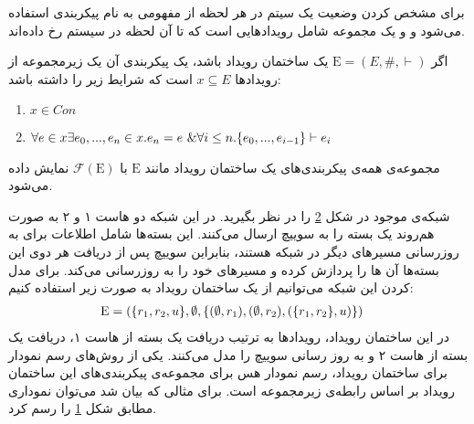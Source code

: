 برای مشخص کردن وضعیت یک سیتم در هر لحظه از مفهومی به نام پیکر‌بندی
استفاده می‌شود و
و یک مجموعه شامل رویدادهایی است که تا آن لحظه در سیستم رخ داده‌اند.
\begin{definition}
    اگر
    $\mathrm{E} = (E,\#,\vdash)$
    یک ساختمان رویداد باشد، یک پیکربندی آن یک زیرمجموعه از رویداد‌ها
    $x \subseteq E$
    است که شرایط زیر را داشته باشد:
    \begin{enumerate}
        \item $x \in Con$
        \item $\forall e \in x \exists e_0,...,e_n \in x. e_n = e \ \&
                  \forall i \leq n. \{e_0,...,e_{i-1}\} \vdash e_i$
    \end{enumerate}
\end{definition}
مجموعه‌ی همه‌ی پیکربندی‌های یک ساختمان رویداد مانند
$\mathrm{E}$
با
$\mathcal{F}(\mathrm{E})$
نمایش داده می‌شود.

شبکه‌ی موجود در شکل
\ref{fig:es:update}
را در نظر بگیرید.
در این شبکه دو هاست ۱ و ۲ به صورت هم‌روند یک بسته را به سوییچ ارسال می‌کنند.
این بسته‌ها شامل اطلاعات برای به روزرسانی مسیر‌های دیگر در شبکه هستند، بنابراین سوییچ پس از دریافت هر دوی این بسته‌ها آن ها را پردازش کرده و مسیر‌های خود را به روزرسانی می‌کند.
برای مدل کردن این شبکه می‌توانیم از یک ساختمان رویداد به صورت زیر استفاده کنیم:
\begin{align*}
    \mathrm{E} & = (
    \{r_1,r_2,u\},
    \emptyset, \{(\emptyset,r_1),(\emptyset,r_2),(\{r_1,r_2\},u)\}
    )
\end{align*}
در این ساختمان رویداد، رویداد‌ها به ترتیب دریافت یک بسته از هاست ۱، دریافت یک بسته از هاست ۲ و به روز رسانی سوییچ را مدل می‌کنند.
یکی از روش‌های رسم نمودار برای ساختمان رویداد، رسم نمودار هس
برای مجموعه‌ی پیکربندی‌های این ساختمان رویداد بر اساس رابطه‌ی زیرمجموعه است.
برای مثالی که بیان شد می‌توان نموداری مطابق شکل
\ref{fig:es:configs}
را رسم کرد.
\begin{figure}
    \centering
    \caption{}
    \label{fig:es:configs}
\end{figure}

\begin{figure}
    \centering
    \caption{}
    \label{fig:es:update}
\end{figure}